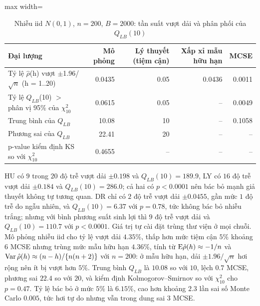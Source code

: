 \begin{table}[H]
\centering\footnotesize
\caption{Nhiễu iid $N(0,1)$, $n=200$, $B=2000$: tần suất vượt dải và phân phối của $Q_{LB}(10)$}\label{tab:tab_b11_04_simulation}
\begin{adjustbox}{max width=\linewidth}
\begin{tabular}{|>{\raggedright\arraybackslash}p{}|r|r|r|r|}
\toprule
Đại lượng & Mô phỏng & Lý thuyết (tiệm cận) & Xấp xỉ mẫu hữu hạn & MCSE \\
\midrule
Tỷ lệ \textbar{}$\hat{\rho}$(h)\textbar{} vượt $\pm$1.96/$\sqrt{n}$ (h = 1..20) & 0.0435 & 0.05 & 0.0436 & 0.0011 \\[3pt]
Tỷ lệ $Q_{LB}$(10) $>$ phân vị 95\% của $\chi^{2}_{10}$ & 0.0615 & 0.05 & – & 0.0049 \\[3pt]
Trung bình của $Q_{LB}$ & 10.08 & 10 & – & 0.1058 \\[3pt]
Phương sai của $Q_{LB}$ & 22.41 & 20 & – & – \\[3pt]
p-value kiểm định KS so với $\chi^{2}_{10}$ & 0.4655 & – & – & – \\[3pt]
\bottomrule
\end{tabular}
\end{adjustbox}\par{}
\end{table}
 HU có $9$ trong $20$ độ trễ vượt dải $\pm0.198$ và $Q_{LB}(10)=189.9$, LY có $16$ độ trễ vượt dải $\pm0.184$ và $Q_{LB}(10)=286.0$; cả hai có $p<0.0001$ nên bác bỏ mạnh giả thuyết không tự tương quan. DR chỉ có $2$ độ trễ vượt dải $\pm0.0455$, gần mức $1$ độ trễ do ngẫu nhiên, và $Q_{LB}(10)=6.37$ với $p=0.78$, tức không bác bỏ nhiễu trắng; nhưng với bình phương suất sinh lợi thì $9$ độ trễ vượt dải và $Q_{LB}(10)=110.7$ với $p<0.0001$. Giá trị tự cài đặt trùng thư viện ở mọi chuỗi. Mô phỏng nhiễu iid cho tỷ lệ vượt dải $4.35\%$, thấp hơn mức tiệm cận $5\%$ khoảng $6$ MCSE nhưng trùng mức mẫu hữu hạn $4.36\%$, tính từ $\mathrm{E}\hat\rho(h)\approx-1/n$ và $\operatorname{Var}\hat\rho(h)\approx(n-h)/\{n(n+2)\}$ với $n=200$: ở mẫu hữu hạn, dải $\pm1.96/\sqrt n$ hơi rộng nên ít bị vượt hơn $5\%$. Trung bình $Q_{LB}$ là $10.08$ so với $10$, lệch $0.7$ MCSE, phương sai $22.4$ so với $20$, và kiểm định Kolmogorov--Smirnov so với $\chi^2_{10}$ cho $p=0.47$. Tỷ lệ bác bỏ ở mức $5\%$ là $6.15\%$, cao hơn khoảng $2.3$ lần sai số Monte Carlo $0.005$, tức hơi tự do nhưng vẫn trong dung sai $3$ MCSE.


